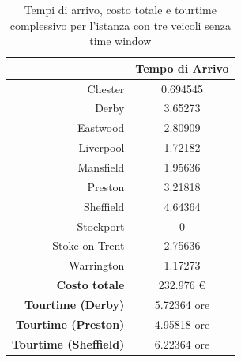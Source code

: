 
		\begin{table}[H]
			\small
			\centering
			\begin{tabular}{rc}

				\toprule
				& Tempo di Arrivo \\

				\midrule
				Chester & 0.694545 \\
				Derby & 3.65273 \\
				Eastwood & 2.80909 \\
				Liverpool & 1.72182 \\
				Mansfield & 1.95636 \\
				Preston  & 3.21818 \\
				Sheffield & 4.64364 \\
				Stockport & 0 \\
				Stoke on Trent & 2.75636 \\
				Warrington & 1.17273 \\
				\midrule
				\textbf{Costo totale} & 232.976 € \\
				\textbf{Tourtime (Derby)} & 5.72364 ore \\
				\textbf{Tourtime (Preston)} & 4.95818 ore \\
				\textbf{Tourtime (Sheffield)} & 6.22364 ore \\
				\bottomrule
			\end{tabular}
			\label{table:instance_3_totale}
			\caption{Tempi di arrivo, costo totale e tourtime complessivo per l'istanza con tre veicoli senza time window}
		\end{table}


		
